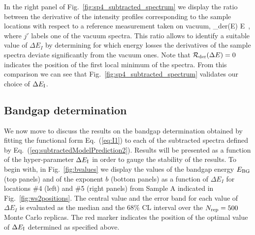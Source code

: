 In the right panel of  Fig.~\ref{fig:sp4_subtracted_spectrum} we display the ratio
between the derivative of the intensity profiles corresponding to the sample locations
with respect to a reference measurement taken on vacuum,
\be
{}_{\rm der}(\Delta E) \equiv 
{}\lp \Delta E\rp \, ,
\ee
where $j'$ labels one of the vacuum spectra.
%
This ratio allows to identify a suitable value of $\Delta E_{I}$ by determining
for which energy losses the derivatives of the sample spectra deviate significantly
from the vacuum ones.
%
Note that $\mathcal{R}_{\rm der}(\Delta E)=0$ indicates the position of the first
local minimum of the spectra.
%
From this comparison we can see that Fig.~\ref{fig:sp4_subtracted_spectrum} validates our choice of
$\Delta E_{\rm I}$.

\subsection{Bandgap determination}

We now move to discuss the results on the bandgap determination obtained
by fitting the functional form Eq.~(\ref{eq:I1}) to each of the subtracted
spectra defined by Eq.~(\ref{eq:subtractedModelPrediction2}).
%
Results will be presented as a function of the hyper-parameter $\Delta E_{\rm I}$
in order to gauge the stability of the results.
%
To begin with, in Fig.~\ref{fig:bvalues}
we display the values of the bandgap energy $E_{\rm BG}$ (top panels)
and of the exponent $b$ (bottom panels) as a function of $\Delta E_I$
for locations \#4 (left)
and \#5 (right panels) from Sample A indicated in Fig.~\ref{fig:ws2positions}.
%
The central value and the error band for each value of $\Delta E_I$ is evaluated
as the median and the 68\% CL interval over the $N_{\rm rep}=500$ Monte Carlo replicas.
%
The red marker indicates the position of the optimal value of
$\Delta E_{\rm I}$ determined as specified above.

